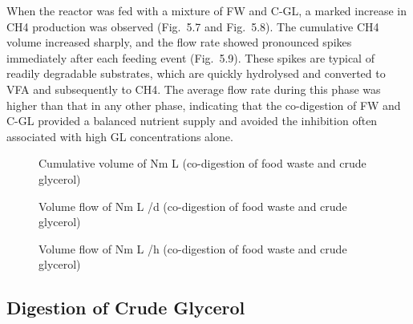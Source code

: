 \documentclass[12pt, a4paper, oneside]{report}
\begin{document}
When the reactor was fed with a mixture of FW and C-GL, a marked increase in CH4 production was observed (Fig. 5.7 and Fig. 5.8). The cumulative CH4 volume increased sharply, and the flow rate showed pronounced spikes immediately after each feeding event (Fig. 5.9). These spikes are typical of readily degradable substrates, which are quickly hydrolysed and converted to VFA and subsequently to CH4. The average flow rate during this phase was higher than that in any other phase, indicating that the co-digestion of FW and C-GL provided a balanced nutrient supply and avoided the inhibition often associated with high GL concentrations alone.

\begin{figure}[H]
    \centering
    \caption{Cumulative volume of  Nm L (co-digestion of food waste and crude glycerol)}
    
\end{figure}

\begin{figure}[H]
    \centering
    \caption{Volume flow of  Nm L /d (co-digestion of food waste and crude glycerol)}
    
\end{figure}

\begin{figure}[H]
    \centering
    \caption{Volume flow of  Nm L /h (co-digestion of food waste and crude glycerol)}
    
\end{figure}

\subsection{Digestion of Crude Glycerol}
\end{document}
